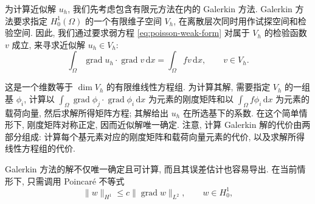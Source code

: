 为计算近似解 $u_h$, 我们先考虑包含有限元方法在内的 Galerkin 方法. Galerkin 方法要求指定 $H^1_0(\Omega)$ 的一个有限维子空间 $V_h$, 在离散层次同时用作试探空间和检验空间. 因此, 我们通过要求弱方程 \eqref{eq:poisson-weak-form} 对属于 $V_h$ 的检验函数 $v$ 成立, 来寻求近似解 $u_h\in V_h$:
\begin{equation}\label{eq:poisson-galerkin-form}
\int_\Omega\operatorname{grad}u_h\cdot\operatorname{grad}v\,\mathrm{d}x=\int_\Omega fv\,\mathrm{d}x,\qquad v\in V_h.
\end{equation}

这是一个维数等于 $\dim V_h$ 的有限维线性方程组. 为计算其解, 需要指定 $V_h$ 的一组基 $\phi_i$, 计算以 $\int_\Omega\operatorname{grad}\phi_j\cdot\operatorname{grad}\phi_i\,\mathrm{d}x$ 为元素的刚度矩阵和以 $\int_\Omega f\phi_i\,\mathrm{d}x$ 为元素的载荷向量, 然后求解所得矩阵方程; 其解给出 $u_h$ 在所选基下的系数. 在这个简单情形下, 刚度矩阵对称正定, 因而近似解唯一确定. 注意, 计算 Galerkin 解的代价由两部分组成: 计算每个基元素对应的刚度矩阵和载荷向量元素的代价, 以及求解所得线性方程组的代价.

Galerkin 方法的解不仅唯一确定且可计算, 而且其误差估计也容易导出. 在当前情形下, 只需调用 Poincaré 不等式
\[
\|w\|_{H^1}\le c\|\operatorname{grad}w\|_{L^2},\qquad w\in H^1_0,
\]

